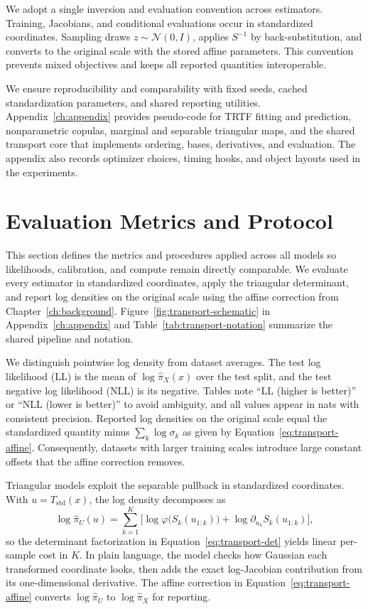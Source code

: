 \documentclass[11pt,a4paper,twoside]{book}\usepackage[]{graphicx}\usepackage[]{xcolor}
\begin{document}
We adopt a single inversion and evaluation convention across estimators. Training, Jacobians, and conditional evaluations occur in standardized coordinates. Sampling draws $z \sim \mathcal{N}(0, I)$, applies $S^{-1}$ by back-substitution, and converts to the original scale with the stored affine parameters. This convention prevents mixed objectives and keeps all reported quantities interoperable.

We ensure reproducibility and comparability with fixed seeds, cached standardization parameters, and shared reporting utilities. Appendix~\ref{ch:appendix} provides pseudo-code for TRTF fitting and prediction, nonparametric copulas, marginal and separable triangular maps, and the shared transport core that implements ordering, bases, derivatives, and evaluation. The appendix also records optimizer choices, timing hooks, and object layouts used in the experiments.

\section{Evaluation Metrics and Protocol}\label{sec:evaluation-protocol}

This section defines the metrics and procedures applied across all models so likelihoods, calibration, and compute remain directly comparable. We evaluate every estimator in standardized coordinates, apply the triangular determinant, and report log densities on the original scale using the affine correction from Chapter~\ref{ch:background}. Figure~\ref{fig:transport-schematic} in Appendix~\ref{ch:appendix} and Table~\ref{tab:transport-notation} summarize the shared pipeline and notation.

We distinguish pointwise log density from dataset averages. The test log likelihood (LL) is the mean of $\log \hat{\pi}_X(x)$ over the test split, and the test negative log likelihood (NLL) is its negative. Tables note “LL (higher is better)” or “NLL (lower is better)” to avoid ambiguity, and all values appear in nats with consistent precision. Reported log densities on the original scale equal the standardized quantity minus $\sum_k \log \sigma_k$ as given by Equation~\eqref{eq:transport-affine}. Consequently, datasets with larger training scales introduce large constant offsets that the affine correction removes.

Triangular models exploit the separable pullback in standardized coordinates. With $u = T_{\mathrm{std}}(x)$, the log density decomposes as
\begin{equation}
  \log \hat{\pi}_U(u) = \sum_{k=1}^{K} \Big[ \log \varphi\big(S_k(u_{1:k})\big) + \log \partial_{u_k} S_k(u_{1:k}) \Big],
  \label{eq:evaluation-triangular}
\end{equation}
so the determinant factorization in Equation~\eqref{eq:transport-det} yields linear per-sample cost in $K$. In plain language, the model checks how Gaussian each transformed coordinate looks, then adds the exact log-Jacobian contribution from its one-dimensional derivative. The affine correction in Equation~\eqref{eq:transport-affine} converts $\log \hat{\pi}_U$ to $\log \hat{\pi}_X$ for reporting.
\end{document}
